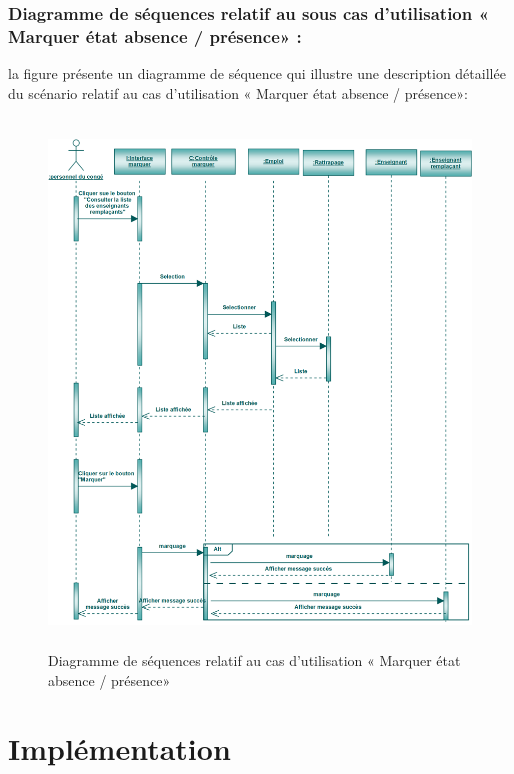 \documentclass[12 pt ]{report}
\begin{document}
\subsubsection{Diagramme de séquences relatif au sous cas d’utilisation   « Marquer état absence / présence» :}
la figure   présente un diagramme de séquence qui illustre une description détaillée du scénario relatif au  cas d’utilisation   « Marquer état absence / présence»: 
\begin{figure}[h]
 \begin{center}
\includegraphics[width= 15 cm ,height=  14cm]{sec_mar_abs.PNG}
\caption{Diagramme de séquences relatif au  cas d’utilisation   «  Marquer état absence / présence»}

\end{center}
\end{figure}
\section{Implémentation}
\end{document}
